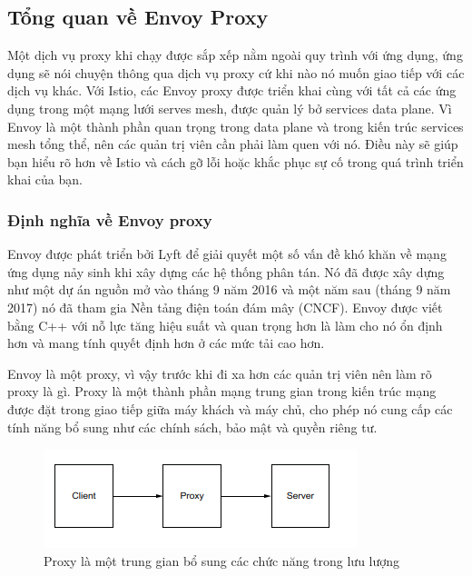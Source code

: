 \documentclass[14pt,a4paper]{book}
\begin{document}
		\subsection{Tổng quan về Envoy Proxy}
		\hspace{0.6cm}Một dịch vụ proxy khi chạy được sắp xếp nằm ngoài quy trình với ứng dụng, ứng dụng sẽ nói chuyện thông qua dịch vụ proxy cứ khi nào nó muốn giao tiếp với các dịch vụ khác. Với Istio, các Envoy proxy được triển khai cùng với tất cả các ứng dụng trong một mạng lưới serves mesh, được quản lý bở services data plane. Vì Envoy là một thành phần quan trọng trong data plane và trong kiến trúc services mesh tổng thể, nên các quản trị viên cần phải làm quen với nó. Điều này sẽ giúp bạn hiểu rõ hơn về Istio và cách gỡ lỗi hoặc khắc phục sự cố trong quá trình triển khai của bạn.
			\subsubsection{Định nghĩa về Envoy proxy}
		\hspace{0.6cm}Envoy được phát triển bởi Lyft để giải quyết một số vấn đề khó khăn về mạng ứng dụng nảy sinh khi xây dựng các hệ thống phân tán. Nó đã được xây dựng như một dự án nguồn mở vào tháng 9 năm 2016 và một năm sau (tháng 9 năm 2017) nó đã tham gia Nền tảng điện toán  đám mây (CNCF). Envoy được viết bằng C++ với nỗ lực tăng hiệu suất và quan trọng hơn là làm cho nó ổn định hơn và mang tính quyết định hơn ở các mức tải cao hơn.
		
		Envoy là một proxy, vì vậy trước khi đi xa hơn các quản trị viên nên làm rõ proxy là gì. Proxy là một thành phần mạng trung gian trong kiến trúc mạng được đặt trong giao tiếp giữa máy khách và máy chủ, cho phép nó cung cấp các tính năng bổ sung như các chính sách, bảo mật và quyền riêng tư.
		
		\begin{figure}[h]
			\centering
			\includegraphics[width=0.7\linewidth]{Pics/2.1.3-p1}
			\caption{Proxy là một trung gian bổ sung các chức năng trong lưu lượng}
			\label{fig:2.1.3-1}
		\end{figure}
		
\end{document}

